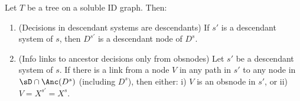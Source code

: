 \newcommand{\decisionsindescendantsystemsaredescendantsstatement}{If $s'$ is a descendant system of $s$, then $D^{s'}$ is a descendant node of $D^s$.}

\begin{lemma}
\label{le:20dec14.1-basic-properties-of-trees-with-SR}
Let $T$ be a tree on a soluble ID graph. Then:
\begin{enumerate}[label=(\alph*)]
    \item (Decisions in descendant systems are descendants) \label{le:20dec14.1a-decisions-in-descendant-systems-are-descendants}
    \decisionsindescendantsystemsaredescendantsstatement

    \item (Info links to ancestor decisions only from obsnodes) \label{le:20dec14.1b-only-info-links-from-observation-nodes-to-ancestor-decisions}
    Let $s'$ be a descendant system of $s$. If there is a link from a node $V$ in 
    any path in
    $s'$ 
    to any node in $\sD \cap \Anc(D^s)$ (including $D^s$), then either: 
    i) $V$ is an obsnode in $s'$, 
    or ii) $V=X^{s'}=X^s$.
\end{enumerate}
\end{lemma}




